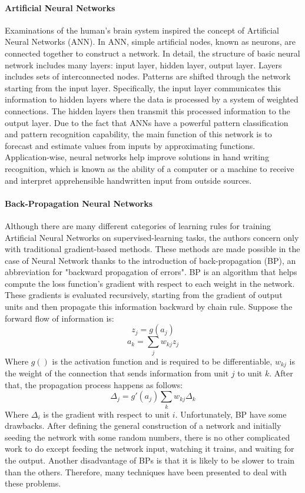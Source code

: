 \documentclass[conference]{IEEEtran}
\begin{document}
\paragraph{Artificial Neural Networks} 
Examinations of the human's brain system inspired the concept of Artificial Neural Networks (ANN). In ANN, simple artificial nodes, known as neurons, are connected together to construct a network. In detail, the structure of basic neural network includes many layers: input layer, hidden layer, output layer. Layers includes sets of interconnected nodes. Patterns are shifted through the network starting from the input layer. Specifically, the input layer communicates this information to hidden layers where the data is processed by a system of weighted connections. The hidden layers then transmit this processed information to the output layer\cite{FundermentalANN}. Due to the fact that ANNs have a powerful pattern classification and pattern recognition capability, the main function of this network is to forecast and estimate values from inputs by approximating functions\cite{ZhangANNForecast}. Application-wise, neural networks help improve solutions in hand writing recognition, which is known as the ability of a computer or a machine to receive and interpret apprehensible handwritten input from outside sources\cite{pittman2008handwriting}.   
\paragraph{Back-Propagation Neural Networks}
Although there are many different categories of learning rules for training Artificial Neural Networks on supervised-learning tasks, the authors concern only with traditional gradient-based methods\cite{buscema1998back}. These methods are made possible in the case of Neural Network thanks to the introduction of back-propagation (BP), an abbreviation for "backward propagation of errors". BP is an algorithm that helps compute the loss function's gradient with respect to each weight in the network. These gradients is evaluated recursively, starting from the gradient of output units and then propagate this information backward by chain rule. Suppose the forward flow of information is:
\[{z_j} = g\left( {a_j} \right)\]
\[{a_k} = \sum\limits_j {{w_{kj}}} {z_j}\]
Where $g()$ is the activation function and is required to be differentiable, ${w_{kj}}$ is the weight of the connection that sends information from unit $j$ to unit $k$. After that, the propagation process happens as follows:
\[{\Delta _j} = g'({a_j})\sum\limits_k {{w_{kj}}} {\Delta _k}\]
Where ${\Delta _i}$ is the gradient with respect to unit $i$. Unfortunately, BP have some drawbacks. After defining the general construction of a network and initially seeding the network with some random numbers, there is no other complicated work to do except feeding the network input, watching it trains, and waiting for the output. Another disadvantage of BPs is that it is likely to be slower to train than the others. Therefore, many techniques have been presented to deal with these problems\cite{Leonard1990337ImproveBPNN, Magoulas:1999:ImproveConvergenceBP, Riedmiller93adirect}.
\end{document}

